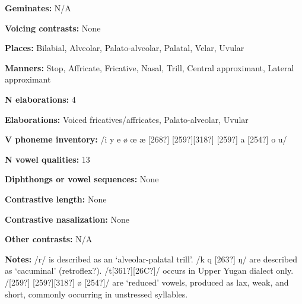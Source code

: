 \begin{styleBody}
\textbf{Geminates:} N/A
\end{styleBody}

\begin{styleBody}
\textbf{Voicing contrasts:} None
\end{styleBody}

\begin{styleBody}
\textbf{Places:} Bilabial, Alveolar, Palato-alveolar, Palatal, Velar, Uvular
\end{styleBody}

\begin{styleBody}
\textbf{Manners:} Stop, Affricate, Fricative, Nasal, Trill, Central approximant, Lateral approximant
\end{styleBody}

\begin{styleBody}
\textbf{N elaborations:} 4
\end{styleBody}

\begin{styleBody}
\textbf{Elaborations:} Voiced fricatives/affricates, Palato-alveolar, Uvular
\end{styleBody}

\begin{styleBody}
\textbf{V phoneme inventory:} /i y e ø œ æ [268?] [259?][318?] [259?] a [254?] o u/
\end{styleBody}

\begin{styleBody}
\textbf{N vowel qualities:} 13
\end{styleBody}

\begin{styleBody}
\textbf{Diphthongs or vowel sequences:} None
\end{styleBody}

\begin{styleBody}
\textbf{Contrastive length:} None
\end{styleBody}

\begin{styleBody}
\textbf{Contrastive nasalization:} None
\end{styleBody}

\begin{styleBody}
\textbf{Other contrasts:} N/A
\end{styleBody}

\begin{styleBody}
\textbf{Notes:} /r/ is described as an ‘alveolar-palatal trill’. /k q [263?] ŋ/ are described as ‘cacuminal’ (retroflex?). /t[361?][26C?]/ occurs in Upper Yugan dialect only. /[259?] [259?][318?] ø [254?]/ are ‘reduced’ vowels, produced as lax, weak, and short, commonly occurring in unstressed syllables.
\end{styleBody}

